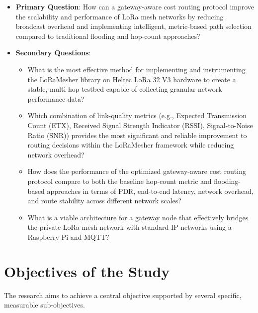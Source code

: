 \begin{itemize}
\item \textbf{Primary Question}: How can a gateway-aware cost routing protocol improve the scalability and performance of LoRa mesh networks by reducing broadcast overhead and implementing intelligent, metric-based path selection compared to traditional flooding and hop-count approaches?

\item \textbf{Secondary Questions}:
\begin{itemize}
\item What is the most effective method for implementing and instrumenting the LoRaMesher library on Heltec LoRa 32 V3 hardware to create a stable, multi-hop testbed capable of collecting granular network performance data?

\item Which combination of link-quality metrics (e.g., Expected Transmission Count (ETX), Received Signal Strength Indicator (RSSI), Signal-to-Noise Ratio (SNR)) provides the most significant and reliable improvement to routing decisions within the LoRaMesher framework while reducing network overhead?

\item How does the performance of the optimized gateway-aware cost routing protocol compare to both the baseline hop-count metric and flooding-based approaches in terms of PDR, end-to-end latency, network overhead, and route stability across different network scales?

\item What is a viable architecture for a gateway node that effectively bridges the private LoRa mesh network with standard IP networks using a Raspberry Pi and MQTT?
\end{itemize}
\end{itemize}

\section{Objectives of the Study}
\label{sec:objectives}

The research aims to achieve a central objective supported by several specific, measurable sub-objectives.

